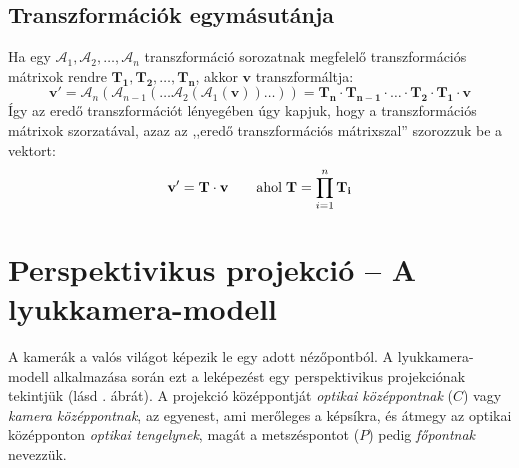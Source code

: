 \subsection{Transzformációk egymásutánja}

Ha egy $\mathcal{A}_1, \mathcal{A}_2, \ldots, \mathcal{A}_n$ transzformáció sorozatnak megfelelő transzformációs mátrixok rendre $\mathbf{T_1}, \mathbf{T_2}, \ldots, \mathbf{T_n}$, akkor $\mathbf{v}$ transzformáltja:
\[\mathbf{v}' = \mathcal{A}_n(\mathcal{A}_{n-1}(\ldots \mathcal{A}_2(\mathcal{A}_1(\mathbf{v}))\ldots)) = \mathbf{T_n} \cdot \mathbf{T_{n-1}} \cdot \ldots \cdot \mathbf{T_2} \cdot \mathbf{T_1} \cdot \mathbf{v}\]
Így az eredő transzformációt lényegében úgy kapjuk, hogy a transzformációs mátrixok szorzatával, azaz az ,,eredő transzformációs mátrixszal'' szorozzuk be a vektort:
\[\mathbf{v}' = \mathbf{T} \cdot \mathbf{v} \qquad \hbox{ahol} \; \mathbf{T} = \prod_{i=1}^{n}{\mathbf{T_i}}\]

\section{Perspektivikus projekció -- A lyukkamera-modell \label{sec:pinhole}}

A kamerák a valós világot képezik le egy adott nézőpontból. A lyukkamera-modell alkalmazása során ezt a leképezést egy perspektivikus projekciónak tekintjük \cite[2.2. fejezet]{pinhole-model} (lásd . ábrát). A projekció középpontját \textit{optikai középpontnak} ($C$) vagy \textit{kamera középpontnak}, az egyenest, ami merőleges a képsíkra, és átmegy az optikai középponton \textit{optikai tengelynek}, magát a metszéspontot ($P$) pedig \textit{főpontnak} nevezzük.

